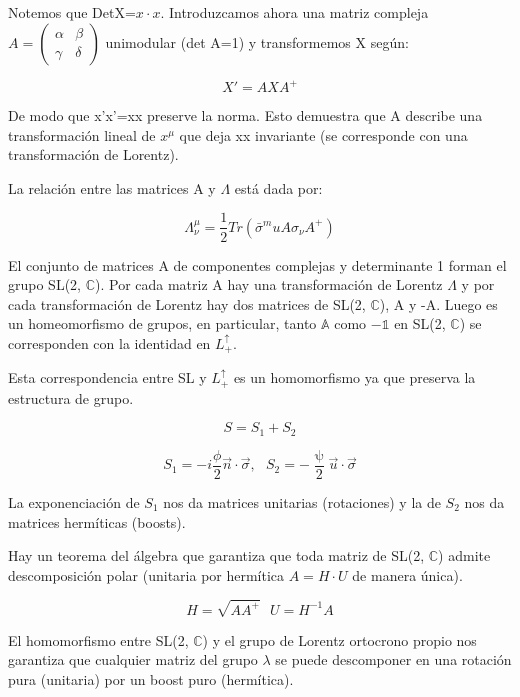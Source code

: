 \documentclass{article}
\begin{document}
\begin{itemize}
            Notemos que DetX=$x\cdot x$. Introduzcamos ahora una matriz compleja $A=\left ( \begin{array}{cc}
                 \alpha & \beta \\
                \gamma & \delta
            \end{array}\right)$ unimodular (det A=1) y transformemos X según:

            $$X'=AXA^+$$

            De modo que x'x'=xx preserve la norma. Esto demuestra que A describe una transformación lineal de $x^\mu$ que deja xx invariante (se corresponde con una transformación de Lorentz).

            \newpage
            La relación entre las matrices A y $\Lambda$ está dada por:

            $$\Lambda _\nu ^\mu =\frac{1}{2}Tr(\bar{\sigma}^mu A \sigma _\nu A^+)$$

            El conjunto de matrices A de componentes complejas y determinante 1 forman el grupo SL(2, $\mathds{C}$). Por cada matriz A hay una transformación de Lorentz $\Lambda$ y por cada transformación de Lorentz hay dos matrices de SL(2, $\mathds{C}$), A y -A. Luego es un homeomorfismo de grupos, en particular, tanto $\mathds{A}$ como $-\mathds{1}$ en SL(2, $\mathds{C}$) se corresponden con la identidad en $L_+^\uparrow$.

            Esta correspondencia entre SL y $L_+^\uparrow$ es un homomorfismo ya que preserva la estructura de grupo.

            $$S=S_1+S_2$$

            $$S_1=-i\frac{\phi}{2}\Vec{n}\cdot \Vec{\sigma}, \ \ \ S_2=-\frac{\uppsi}{2}\Vec{u}\cdot \Vec{\sigma}$$

            La exponenciación de $S_1$ nos da matrices unitarias (rotaciones) y la de $S_2$ nos da matrices hermíticas (boosts).

            \smallskip
            Hay un teorema del álgebra que garantiza que toda matriz de SL(2, $\mathds{C}$) admite descomposición polar (unitaria por hermítica $A=H\cdot U$ de manera única).

            $$H=\sqrt{AA^+} \ \ \ U=H^{-1}A$$

            El homomorfismo entre SL(2, $\mathds{C}$) y el grupo de Lorentz ortocrono propio nos garantiza que cualquier matriz del grupo $\lambda$ se puede descomponer en una rotación pura (unitaria) por un boost puro (hermítica).

         \end{itemize}
\end{document}
